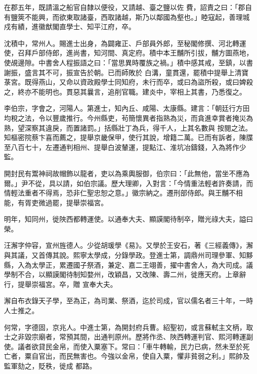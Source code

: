 \begin{pinyinscope}
 在郡五年，既請溫之船官自隸以便役，又請越、臺之鹽以佐
 費，詔責之曰：「郡自有鹽筴不能興，而欲東取諸臺，西取諸越，斯乃以鄰國為壑也。」睦寇起，善理城戍有績，進徽猷閣直學士、知平江府，卒。



 沈積中，常州人。賜進士出身，為闢雍正、戶部員外郎，至秘閣修撰、河北轉運使，召拜戶部侍郎，進尚書，知河間、真定府。積中本王黼所引拔，黼方圖燕地，使覘邊隙。中書舍人程振語之曰：「當思異時覆族之禍。」積中感其戒，至鎮，以書謝振，盛言其不可，振宣告於朝。已而師敗於
 白溝，童貫還，罷積中提舉上清寶菉宮。既得燕山，又命以資政殿學士同知府，未行而卒，或曰為盜所殺，或曰婢殺之，終亦不能明也。貫惡其曩言，追削官職。建炎中，宰相上其書，乃悉復之。



 李伯宗，字會之，河陽人。第進士，知內丘、咸陽、太康縣。建言：「朝廷行方田均稅之法，令以豐歲推行。今州縣吏，茍簡懷異者指熟為災，而貪進幸賞者掩災為熟，望深察其違戾，而置諸罰。」括縣壯丁為兵，得千人，上其名數與
 按閱之法。知樞密院蔡卞喜而薦之，提舉京畿保甲，使行其說，增籍二萬。已而有訴者，陳牒至八百七十，左遷通判相州、提舉白波輦運，提點江、淮坑冶鑄錢，入為將作少監。



 開封民有鬻神祠故帽飾以龍者，吏以為乘輿服御，伯宗曰：「此無他，當坐不應為爾。」尹不從，具以請，如伯宗議。歷大理卿，入對言：「今情重法輕者許奏請，而情輕法重者不得焉，恐非仁聖忠恕之意。」徽宗納之。遷刑部侍郎。與王黼不相能，有胥吏微過罷，提舉崇福宮。



 明年，知同州，徙陜西都轉運使。以通奉大夫、顯謨閣待制卒，贈光祿大夫，謚曰榮。



 汪澥字仲容，宣州旌德人。少從胡瑗學《易》。又學於王安石，著《三經義傳》，澥與其議，又首傳其說。熙寧太學成，分錄學政。登進士第，調鼎州司理參軍、知黟縣，入為太學正，累遷國子祭酒，兼定、嘉二王翊善，擢中書舍人，為大司成。議學制不合，以顯謨閣待制知婺州，改穎昌，又改陳、壽二州，徙應天府。上章辭行，提舉崇福宮。卒，贈
 宣奉大夫。



 澥自布衣錄天子學，至為正，為司業、祭酒，迄於司成，官以儒名者三十年，一時人士推之。



 何常，字德固，京兆人。中進士第，為開封府兵曹。紹聖初，或言蘇軾主文柄，取士之非毀宗廟者，常預其間，出通判原州。歷將作丞、陜西轉運判官、熙河轉運副使。議者欲貸民金帛，而使入粟塞下。常曰：「車牛轉輸，民力已病，然未至於死亡者，粟自官出，而民無害也。今強以金帛，使自入粟，懼非貧弱之利。」熙帥及監軍劾之，貶秩，徙成
 都路。




\end{pinyinscope}
